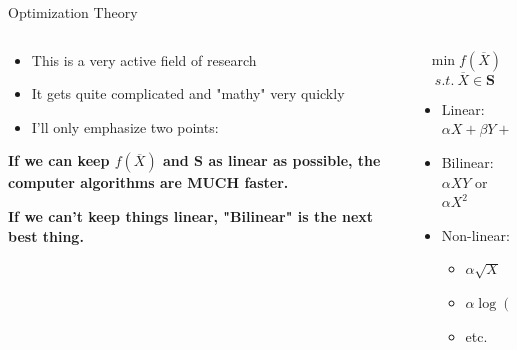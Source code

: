 \documentclass[10pt, aspectratio=169]{beamer}
\begin{document}
\begin{frame}[t]{Optimization Theory}
    \begin{columns}[t]
        \begin{column}[t]{0.5\textwidth}
            \begin{itemize}
                \item This is a very active field of research
                \item It gets quite complicated and "mathy" very quickly
                \item  I'll only emphasize two points:
            \end{itemize}
            \vspace{0.5cm}
            \begin{center}
                \textbf{If we can keep $f(\overline{X})$ and $\textbf{S}$ as linear as possible, the computer algorithms are MUCH faster.}
                
                \vspace{0.4cm}
                
                \textbf{If we can't keep things linear, "Bilinear" is the next best thing.}
            \end{center}
        \end{column}
        \begin{column}[t]{0.5\textwidth}
            $$\min f(\overline{X})$$
            $$s.t.\ \overline{X} \in \textbf{S}$$
            \vspace{1cm}
            \begin{itemize}
                \item Linear: $\alpha X + \beta Y + \gamma Z$
                \item Bilinear: $\alpha X Y$ or $\alpha X^2$
                \item Non-linear: 
                \begin{itemize}
                    \item $\alpha\sqrt{X}$
                    \item $\alpha \log{\left(X\right)}$
                    \item etc.
                \end{itemize}
            \end{itemize}
        \end{column}
    \end{columns}
\end{frame}
\end{document}
